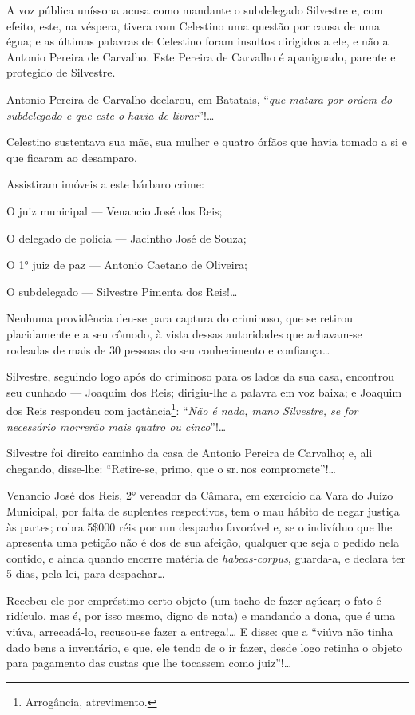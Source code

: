 A voz pública uníssona acusa como mandante o subdelegado Silvestre e,
com efeito, este, na véspera, tivera com Celestino uma questão por causa
de uma égua; e as últimas palavras de Celestino foram insultos dirigidos
a ele, e não a Antonio Pereira de Carvalho. Este Pereira de Carvalho é
apaniguado, parente e protegido de Silvestre.

Antonio Pereira de Carvalho declarou, em Batatais, ``\emph{que matara por
ordem do subdelegado e que este o havia de livrar}''!\ldots{}

Celestino sustentava sua mãe, sua mulher e quatro órfãos que havia
tomado a si e que ficaram ao desamparo.

Assistiram imóveis a este bárbaro crime:

O juiz municipal --- Venancio José dos Reis;

O delegado de polícia --- Jacintho José de Souza;

O 1° juiz de paz --- Antonio Caetano de Oliveira;

O subdelegado --- Silvestre Pimenta dos Reis!\ldots{}

Nenhuma providência deu-se para captura do criminoso, que se retirou
placidamente e a seu cômodo, à vista dessas autoridades que achavam-se
rodeadas de mais de 30 pessoas do seu conhecimento e confiança\ldots{}

Silvestre, seguindo logo após do criminoso para os lados da sua casa,
encontrou seu cunhado --- Joaquim dos Reis; dirigiu-lhe a palavra em voz
baixa; e Joaquim dos Reis respondeu com jactância\footnote{ Arrogância,
  atrevimento.}: ``\emph{Não é nada, mano Silvestre, se for necessário
morrerão mais quatro ou cinco}''!\ldots{}

Silvestre foi direito caminho da casa de Antonio Pereira de Carvalho; e,
ali chegando, disse-lhe: ``Retire-se, primo, que o sr.\,nos
compromete''!\ldots{}

Venancio José dos Reis, 2° vereador da Câmara, em exercício da Vara do
Juízo Municipal, por falta de suplentes respectivos, tem o mau hábito de
negar justiça às partes; cobra 5\$000 réis por um despacho favorável e,
se o indivíduo que lhe apresenta uma petição não é dos de sua afeição,
qualquer que seja o pedido nela contido, e ainda quando encerre matéria
de \emph{habeas-corpus}, guarda-a, e declara ter 5 dias, pela lei, para
despachar\ldots{}

Recebeu ele por empréstimo certo objeto (um tacho de fazer açúcar; o
fato é ridículo, mas é, por isso mesmo, digno de nota) e mandando a
dona, que é uma viúva, arrecadá-lo, recusou-se fazer a entrega!\ldots{} E
disse: que a ``viúva não tinha dado bens a inventário, e que, ele tendo
de o ir fazer, desde logo retinha o objeto para pagamento das custas que
lhe tocassem como juiz''!\ldots{}

